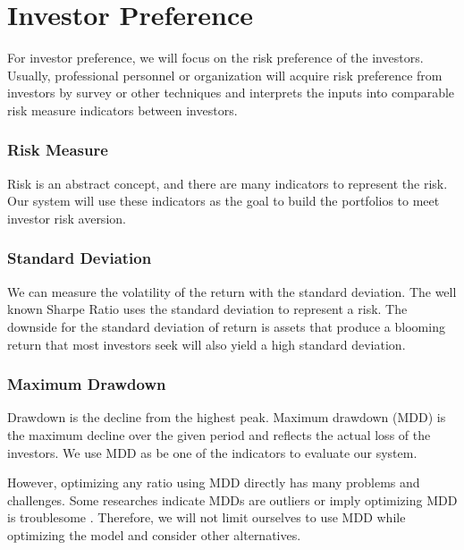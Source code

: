 \section{Investor Preference}
For investor preference, we will focus on the risk preference of the investors. Usually, professional personnel or organization will acquire risk preference from investors by survey or other techniques and interprets the inputs into comparable risk measure indicators between investors. 
\subsubsection{Risk Measure}
Risk is an abstract concept, and there are many indicators to represent the risk. Our system will use these indicators as the goal to build the portfolios to meet investor risk aversion.  
\subsubsection{Standard Deviation}
We can measure the volatility of the return with the standard deviation. The well known Sharpe Ratio uses the standard deviation to represent a risk. The downside for the standard deviation of return is assets that produce a blooming return that most investors seek will also yield a high standard deviation.
\subsubsection{Maximum Drawdown}
Drawdown is the decline from the highest peak. Maximum drawdown (MDD) is the maximum decline over the given period and reflects the actual loss of the investors. We use MDD as be one of the indicators to evaluate our system. 
\par
However, optimizing any ratio using MDD directly has many problems and challenges. Some researches indicate MDDs are outliers \cite {johansen2002large, johansen1998stock} or imply optimizing MDD is troublesome \cite{moody1998performance}. Therefore, we will not limit ourselves to use MDD while optimizing the model and consider other alternatives. 